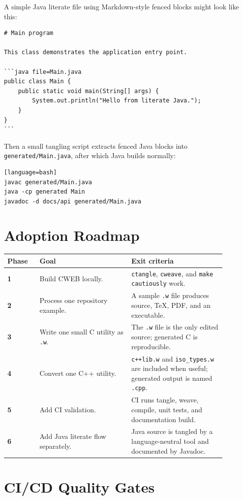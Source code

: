 \documentclass[11pt]{article}
\begin{document}
A simple Java literate file using Markdown-style fenced blocks might look like this:

\begin{verbatim}
# Main program

This class demonstrates the application entry point.

```java file=Main.java
public class Main {
    public static void main(String[] args) {
        System.out.println("Hello from literate Java.");
    }
}
```
\end{verbatim}

Then a small tangling script extracts fenced Java blocks into \texttt{generated/Main.java}, after which Java builds normally:

\begin{verbatim}[language=bash]
javac generated/Main.java
java -cp generated Main
javadoc -d docs/api generated/Main.java
\end{verbatim}

\section{Adoption Roadmap}

\begin{longtable}{>{\bfseries}p{0.13\linewidth} p{0.37\linewidth} p{0.38\linewidth}}
\toprule
Phase & Goal & Exit criteria \\
\midrule
1 & Build CWEB locally. & \texttt{ctangle}, \texttt{cweave}, and \texttt{make cautiously} work. \\
2 & Process one repository example. & A sample \texttt{.w} file produces source, TeX, PDF, and an executable. \\
3 & Write one small C utility as \texttt{.w}. & The \texttt{.w} file is the only edited source; generated C is reproducible. \\
4 & Convert one C++ utility. & \texttt{c++lib.w} and \texttt{iso\_types.w} are included when useful; generated output is named \texttt{.cpp}. \\
5 & Add CI validation. & CI runs tangle, weave, compile, unit tests, and documentation build. \\
6 & Add Java literate flow separately. & Java source is tangled by a language-neutral tool and documented by Javadoc. \\
\bottomrule
\end{longtable}

\section{CI/CD Quality Gates}
\end{document}
